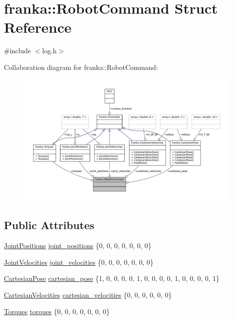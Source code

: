 \hypertarget{structfranka_1_1RobotCommand}{}\section{franka\+:\+:Robot\+Command Struct Reference}
\label{structfranka_1_1RobotCommand}


{\ttfamily \#include $<$log.\+h$>$}



Collaboration diagram for franka\+:\+:Robot\+Command\+:
\nopagebreak
\begin{figure}[H]
\begin{center}
\leavevmode
\includegraphics[width=350pt]{structfranka_1_1RobotCommand__coll__graph}
\end{center}
\end{figure}
\subsection*{Public Attributes}
\begin{DoxyCompactItemize}
\item 
\hyperlink{classfranka_1_1JointPositions}{Joint\+Positions} \hyperlink{structfranka_1_1RobotCommand_a086afcec596eae5284b6c39dc1452280}{joint\+\_\+positions} \{0, 0, 0, 0, 0, 0, 0\}
\item 
\hyperlink{classfranka_1_1JointVelocities}{Joint\+Velocities} \hyperlink{structfranka_1_1RobotCommand_a049657cf2bbbb53d6ffa5581721e7b71}{joint\+\_\+velocities} \{0, 0, 0, 0, 0, 0, 0\}
\item 
\hyperlink{classfranka_1_1CartesianPose}{Cartesian\+Pose} \hyperlink{structfranka_1_1RobotCommand_acce2090d696ebb9759fd0f37fd35a298}{cartesian\+\_\+pose} \{1, 0, 0, 0, 0, 1, 0, 0, 0, 0, 1, 0, 0, 0, 0, 1\}
\item 
\hyperlink{classfranka_1_1CartesianVelocities}{Cartesian\+Velocities} \hyperlink{structfranka_1_1RobotCommand_a04b4841130fab920936190be1bc5dba3}{cartesian\+\_\+velocities} \{0, 0, 0, 0, 0, 0\}
\item 
\hyperlink{classfranka_1_1Torques}{Torques} \hyperlink{structfranka_1_1RobotCommand_a8b23e8b669b1fd594988ecdbf54bfbce}{torques} \{0, 0, 0, 0, 0, 0, 0\}
\end{DoxyCompactItemize}


